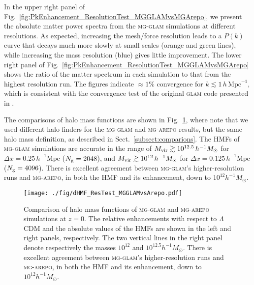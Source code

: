 In the upper right panel of Fig.~\ref{fig:PkEnhancement_ResolutionTest_MGGLAMvsMGArepo}, we present the absolute matter power spectra from the \textsc{mg-glam} simulations at different resolutions. As expected, increasing the mesh/force resolution leads to a $P(k)$ curve that decays much more slowly at small scales (orange and green lines), while increasing the mass resolution (blue) gives little improvement. The lower right panel of Fig.~\ref{fig:PkEnhancement_ResolutionTest_MGGLAMvsMGArepo} shows the ratio of the matter spectrum in each simulation to that from the highest resolution run. The figures indicate $\approx1 \%$ convergence for $k \lesssim 1 \, h \,\mathrm{Mpc}^{-1}$, which is consistent with the convergence test of the original \textsc{glam} code presented in \citep{Klypin:2017iwu}.

The comparisons of halo mass functions are shown in Fig.~\ref{fig:dHMF_ResTest_MGGLAMvsArepo}, where note that we used different halo finders for the \textsc{mg-glam} and \textsc{mg-arepo} results, but the same halo mass definition, as described in Sect.~\ref{subsect:comparions}. The HMFs of \textsc{mg-glam} simulations are accurate in the range of $M_{\rm vir} \gtrsim 10^{12.5} \, h^{-1}M_{\odot}$ for $\Delta x = 0.25 \, h^{-1}\mathrm{Mpc}$ ($N_{\rm g} = 2048$), and $M_{\rm vir} \gtrsim 10^{12}\, h^{-1}M_{\odot}$ for $\Delta x = 0.125 \, h^{-1}\mathrm{Mpc}$ ($N_{\rm g} = 4096$). There is excellent agreement between \textsc{mg-glam}'s higher-resolution runs and \textsc{mg-arepo}, in both the HMF and its enhancement, down to $10^{12}h^{-1}M_\odot$.



\begin{figure}
    \centering 
    \texttt{[image: ./fig/dHMF\_ResTest\_MGGLAMvsArepo.pdf]}
    \caption{Comparison of halo mass functions of \textsc{mg-glam} and \textsc{mg-arepo} simulations at $z=0$.
    The relative enhancements with respect to $\Lambda$CDM and the absolute values of the HMFs are shown in the left and right panels, respectively. The two vertical lines in the right panel denote respectively the masses $10^{12}$ and $10^{12.5}h^{-1}M_\odot$. There is excellent agreement between \textsc{mg-glam}'s higher-resolution runs and \textsc{mg-arepo}, in both the HMF and its enhancement, down to $10^{12}h^{-1}M_\odot$.
    }
    \label{fig:dHMF_ResTest_MGGLAMvsArepo}
\end{figure}


